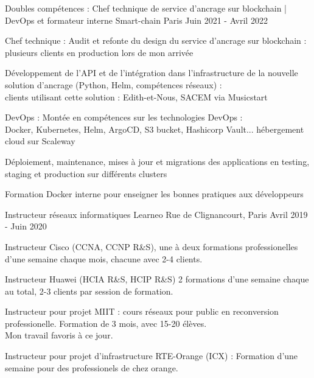 
\begin{cventries}
  \cventry
    {Doubles compétences : Chef technique de service d'ancrage sur blockchain | DevOps et formateur interne} %
    {Smart-chain} %
    {Paris} %
    {Juin 2021 - Avril 2022} %
    {
      \begin{cvitems} %
      {
        \item {Chef technique : Audit et refonte du design du service d'ancrage sur blockchain :\\plusieurs clients en production lors de mon arrivée}
        \item {Développement de l'API et de l'intégration dans l'infrastructure de la nouvelle solution d'ancrage (Python, Helm, compétences réseaux) :\\clients utilisant cette solution : Edith-et-Nous, SACEM via Musicstart}
        \item {DevOps : Montée en compétences sur les technologies DevOps :\\Docker, Kubernetes, Helm, ArgoCD, S3 bucket, Hashicorp Vault... hébergement cloud sur Scaleway}
        \item {Déploiement, maintenance, mises à jour et migrations des applications en testing, staging et production sur différents clusters}
        \item {Formation Docker interne pour enseigner les bonnes pratiques aux développeurs}
      }
      \end{cvitems}
    }

  \cventry
    {Instructeur réseaux informatiques} %
    {Learneo} %
    {Rue de Clignancourt, Paris} %
    {Avril 2019 - Juin 2020} %
    {
      \begin{cvitems} %
      {
        \item {Instructeur Cisco (CCNA, CCNP R\&S), une à deux formations professionelles d'une semaine chaque mois, chacune avec 2-4 clients.}
        \item {Instructeur Huawei (HCIA R\&S, HCIP R\&S) 2 formations d'une semaine chaque au total, 2-3 clients par session de formation.}
        \item {Instructeur pour projet MIIT : cours réseaux pour public en reconversion professionelle. Formation de 3 mois, avec 15-20 élèves.\\Mon travail favoris à ce jour.}
        \item {Instructeur pour projet d'infrastructure RTE-Orange (ICX) : Formation d'une semaine pour des professionels de chez orange.}
      }
      \end{cvitems}
    }


\end{cventries}
